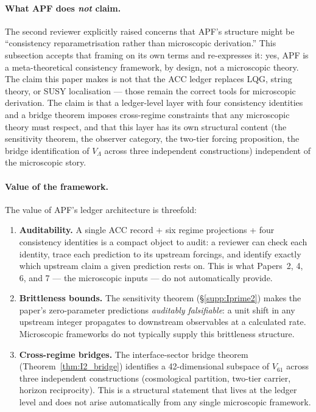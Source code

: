 \documentclass[11pt]{article}
\theoremstyle{plain}
\theoremstyle{definition}
\theoremstyle{remark}
\begin{document}
\paragraph{What APF does \emph{not} claim.}  The second reviewer explicitly raised concerns that APF's structure might be ``consistency reparametrisation rather than microscopic derivation.''  This subsection accepts that framing on its own terms and re-expresses it: yes, APF is a meta-theoretical consistency framework, by design, not a microscopic theory.  The claim this paper makes is not that the ACC ledger replaces LQG, string theory, or SUSY localisation --- those remain the correct tools for microscopic derivation.  The claim is that a ledger-level layer with four consistency identities and a bridge theorem imposes cross-regime constraints that any microscopic theory must respect, and that this layer has its own structural content (the sensitivity theorem, the observer category, the two-tier forcing proposition, the bridge identification of $V_\Lambda$ across three independent constructions) independent of the microscopic story.

\paragraph{Value of the framework.}  The value of APF's ledger architecture is threefold:
\begin{enumerate}[leftmargin=2.5em,itemsep=3pt]
  \item \textbf{Auditability.}  A single ACC record + six regime projections + four consistency identities is a compact object to audit: a reviewer can check each identity, trace each prediction to its upstream forcings, and identify exactly which upstream claim a given prediction rests on.  This is what Papers~2, 4, 6, and 7 --- the microscopic inputs --- do not automatically provide.
  \item \textbf{Brittleness bounds.}  The sensitivity theorem (\S\ref{supp:Iprime2}) makes the paper's zero-parameter predictions \emph{auditably falsifiable}: a unit shift in any upstream integer propagates to downstream observables at a calculated rate.  Microscopic frameworks do not typically supply this brittleness structure.
  \item \textbf{Cross-regime bridges.}  The interface-sector bridge theorem (Theorem~\ref{thm:I2_bridge}) identifies a 42-dimensional subspace of $V_{61}$ across three independent constructions (cosmological partition, two-tier carrier, horizon reciprocity).  This is a structural statement that lives at the ledger level and does not arise automatically from any single microscopic framework.
\end{enumerate}
\end{document}
